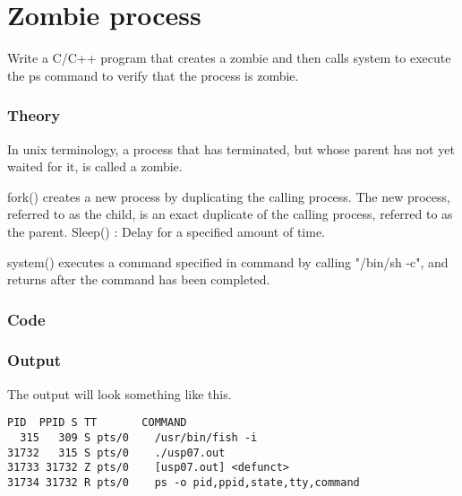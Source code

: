 \chapter{Zombie process}

Write a C/C++ program that creates a zombie and then calls system to execute the ps command to verify that the process is zombie.

\subsection{Theory}

In unix terminology, a process that has terminated, but whose parent has not yet waited for it, is called a zombie.

fork() creates a new process by duplicating the calling process. The new process, referred to as the child, is an exact duplicate of the calling process, referred to as the parent. Sleep() : Delay for a specified amount of time.

system() executes a command specified in command by calling "/bin/sh -c", and returns after the command has been completed.

\subsection{Code}



\subsection{Output}

The output will look something like this.

\begin{lstlisting}[style=shell-output]
  PID  PPID S TT       COMMAND
  315   309 S pts/0    /usr/bin/fish -i
31732   315 S pts/0    ./usp07.out
31733 31732 Z pts/0    [usp07.out] <defunct>
31734 31732 R pts/0    ps -o pid,ppid,state,tty,command
\end{lstlisting}

